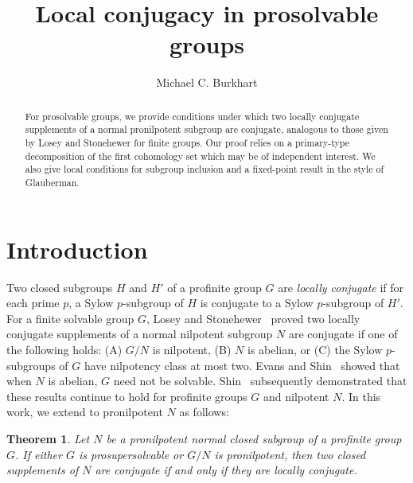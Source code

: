 \documentclass{amsart}
\newtheorem{theorem}{Theorem}[section]
\theoremstyle{definition}
\theoremstyle{remark}
\numberwithin{equation}{section}
\begin{document}
\title{Local conjugacy in prosolvable groups}

\author{Michael C. Burkhart}



\maketitle

\begin{abstract}
	For prosolvable groups, we provide conditions under which two locally conjugate supplements of a normal pronilpotent subgroup are conjugate, analogous to those given by Losey and Stonehewer for finite groups. Our proof relies on a primary-type decomposition of the first cohomology set which may be of independent interest. We also give local conditions for subgroup inclusion and a fixed-point result in the style of Glauberman.
\end{abstract}

\section{Introduction}

Two closed subgroups $H$ and $H'$ of a profinite group $G$ are \emph{locally conjugate} if for each prime $p$, a Sylow $p$-subgroup of $H$ is conjugate to a Sylow $p$-subgroup of $H'$. For a finite solvable group $G$, Losey and Stonehewer~\cite{Los79} proved two locally conjugate supplements of a normal nilpotent subgroup $N$ are conjugate if one of the following holds: (A) $G/N$ is nilpotent, (B) $N$ is abelian, or (C) the Sylow $p$-subgroups of $G$ have nilpotency class at most two. Evans and Shin~\cite{Eva88} showed that when $N$ is abelian, $G$ need not be solvable. Shin~\cite{Shi95} subsequently demonstrated that these results continue to hold for profinite groups $G$ and nilpotent $N$. In this work, we extend to pronilpotent $N$ as follows:

\begin{theorem}
	\label{thm:loc_conj}
	Let $N$ be a pronilpotent normal closed subgroup of a profinite group $G$. If either $G$ is prosupersolvable or $G/N$ is pronilpotent, then two closed supplements of $N$ are conjugate if and only if they are locally conjugate.
\end{theorem}
\end{document}
